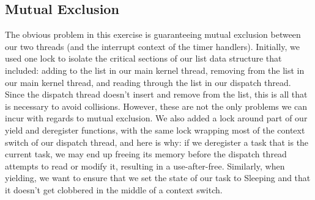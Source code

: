 \documentclass{article}
\begin{document}
\subsection{Mutual Exclusion}
The obvious problem in this exercise is guaranteeing mutual exclusion between our two threads (and the interrupt context of the timer handlers). Initially, we used one lock to isolate the critical sections of our list data structure that included: adding to the list in our main kernel thread, removing from the list in our main kernel thread, and reading through the list in our dispatch thread. Since the dispatch thread doesn't insert and remove from the list, this is all that is necessary to avoid collisions. However, these are not the only problems we can incur with regards to mutual exclusion. We also added a lock around part of our yield and deregister functions, with the same lock wrapping most of the context switch of our dispatch thread, and here is why: if we deregister a task that is the current task, we may end up freeing its memory before the dispatch thread attempts to read or modify it, resulting in a use-after-free. Similarly, when yielding, we want to ensure that we set the state of our task to Sleeping and that it doesn't get clobbered in the middle of a context switch.
\end{document}
